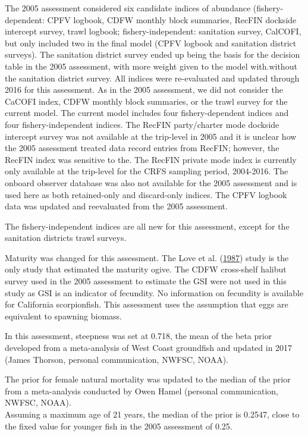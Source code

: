 \documentclass[12pt,]{article}
\begin{document}
The 2005 assessment considered six candidate indices of abundance
(fishery-dependent: CPFV logbook, CDFW monthly block summaries, RecFIN
dockside intercept survey, trawl logbook; fishery-independent:
sanitation survey, CalCOFI, but only included two in the final model
(CPFV logbook and sanitation district surveys). The sanitation district
survey ended up being the basis for the decision table in the 2005
assessment, with more weight given to the model with.without the
sanitation district survey. All indices were re-evaluated and updated
through 2016 for this assessment. As in the 2005 assessment, we did not
consider the CaCOFI index, CDFW monthly block summaries, or the trawl
survey for the current model. The current model includes four
fishery-dependent indices and four fishery-independent indices. The
RecFIN party/charter mode dockside intercept survey was not available at
the trip-level in 2005 and it is unclear how the 2005 assessment treated
data record entries from RecFIN; however, the RecFIN index was sensitive
to the. The RecFIN private mode index is currently only available at the
trip-level for the CRFS sampling period, 2004-2016. The onboard observer
database was also not available for the 2005 assessment and is used here
as both retained-only and discard-only indices. The CPFV logbook data
was updated and reevaluated from the 2005 assessment.

The fishery-independent indices are all new for this assessment, except
for the sanitation districts trawl surveys.

Maturity was changed for this assessment. The Love et al.
(\protect\hyperlink{ref-Love1987}{1987}) study is the only study that
estimated the maturity ogive. The CDFW cross-shelf halibut survey used
in the 2005 assessment to estimate the GSI were not used in this study
as GSI is an indicator of fecundity. No information on fecundity is
available for California scorpionfish. This assessment uses the
assumption that eggs are equivalent to spawning biomass.

In this assessment, steepness was set at 0.718, the mean of the beta
prior developed from a meta-analysis of West Coast groundfish and
updated in 2017 (James Thorson, personal communication, NWFSC, NOAA).

The prior for female natural mortality was updated to the median of the
prior from a meta-analysis conducted by Owen Hamel (personal
communication, NWFSC, NOAA).\\
Assuming a maximum age of 21 years, the median of the prior is 0.2547,
close to the fixed value for younger fish in the 2005 assessment of
0.25.
\end{document}
